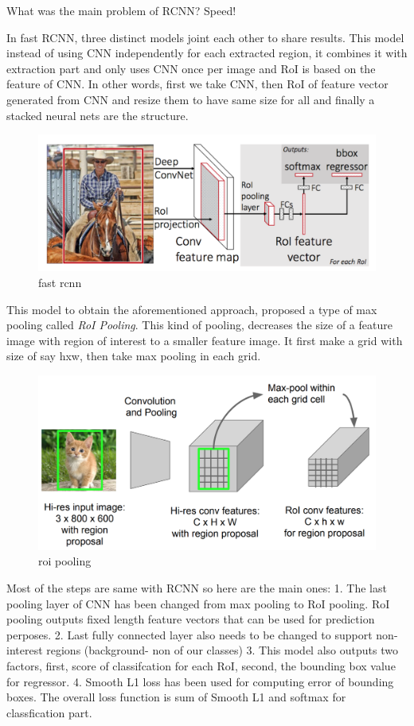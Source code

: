 \documentclass[11pt]{article}
\makeatletter
\def\maxwidth{\ifdim\Gin@nat@width>\linewidth\linewidth
    \else\Gin@nat@width\fi}
\let\Oldincludegraphics\includegraphics
\renewcommand{\includegraphics}[1]{\Oldincludegraphics[width=.8\maxwidth]{#1}}
\makeatother
\begin{document}
What was the main problem of RCNN? Speed!

In fast RCNN, three distinct models joint each other to share results.
This model instead of using CNN independently for each extracted region,
it combines it with extraction part and only uses CNN once per image and
RoI is based on the feature of CNN. In other words, first we take CNN,
then RoI of feature vector generated from CNN and resize them to have
same size for all and finally a stacked neural nets are the structure.

\begin{figure}
\centering
\includegraphics{wiki/fast1.png}
\caption{fast rcnn}
\end{figure}

This model to obtain the aforementioned approach, proposed a type of max
pooling called \emph{RoI Pooling}. This kind of pooling, decreases the
size of a feature image with region of interest to a smaller feature
image. It first make a grid with size of say hxw, then take max pooling
in each grid.

\begin{figure}
\centering
\includegraphics{wiki/fast2.png}
\caption{roi pooling}
\end{figure}

Most of the steps are same with RCNN so here are the main ones: 1. The
last pooling layer of CNN has been changed from max pooling to RoI
pooling. RoI pooling outputs fixed length feature vectors that can be
used for prediction perposes. 2. Last fully connected layer also needs
to be changed to support non-interest regions (background- non of our
classes) 3. This model also outputs two factors, first, score of
classifcation for each RoI, second, the bounding box value for
regressor. 4. Smooth L1 loss has been used for computing error of
bounding boxes. The overall loss function is sum of Smooth L1 and
softmax for classfication part.
\end{document}
